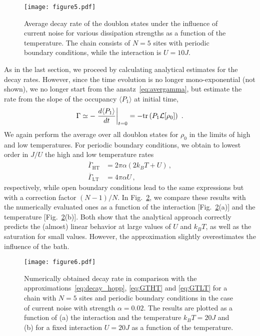 \documentclass[twocolumn,prb,showpacs]{revtex4-1}
\DeclarePairedDelimiter\mean{\langle}{\rangle}
\newcommand*{\diff}{d}
\newcommand*{\tr}[1]{\mathrm{tr}\left(#1\right)}
\begin{document}
\begin{figure}
    \centering\texttt{[image: figure5.pdf]}
    \caption{Average decay rate of the doublon states under the influence
    of current noise for various dissipation strengths as a function of
    the temperature.  The chain consists of $N=5$ sites with periodic boundary
    conditions, while the interaction is $U=10J$.}
    \label{fig:numerics_hopp}
\end{figure}

As in the last section, we proceed by calculating analytical estimates for
the decay rates.  However, since the time evolution is no longer
mono-exponential (not shown), we no longer start from the
ansatz~\eqref{eq:avergamma}, but estimate the rate from the slope of the
occupancy $\langle P_1\rangle$ at initial time,
\begin{equation}
    \Gamma \simeq - \left. \frac{\diff \mean{P_1}}{\diff t} \right|_{t=0} =
        - \tr{P_1\mathcal{L}[\rho_0]} \ .
    \label{eq:decay_hopp}
\end{equation}
We again perform the average over all doublon states for $\rho_0$
in the limits of high and low temperatures.  For periodic boundary
conditions, we obtain to lowest order in $J/U$ the high and low temperature
rates 
\begin{align}
    \overline{\Gamma}_\mathrm{HT} & = 2\pi\alpha \left(2k_B T+U \right) \,,
    \label{eq:GTHT}  \\
    \overline{\Gamma}_\text{LT} & = 4\pi\alpha U \,,
    \label{eq:GTLT}
\end{align}
respectively,
while open boundary conditions lead to the same expressions but with a
correction factor $(N-1)/N$.
In Fig.~\ref{fig:analyricsHopp}, we compare these results with the
numerically evaluated ones as a function of the interaction
[Fig.~\ref{fig:analyricsHopp}(a)] and
the temperature [Fig.~\ref{fig:analyricsHopp}(b)].  Both show that the
analytical approach correctly predicts the (almost) linear behavior at
large values of $U$ and $k_BT$, as well as the saturation for small values.
However, the approximation slightly overestimates the influence of the
bath.

\begin{figure}
    \centering\texttt{[image: figure6.pdf]}
    \caption{Numerically obtained decay rate in comparison with the
        approximations~\eqref{eq:decay_hopp}, \eqref{eq:GTHT} and 
        \eqref{eq:GTLT} for a chain with $N=5$ sites and periodic boundary 
        conditions in the case of current noise with strength $\alpha=0.02$.  
        The results are plotted as a function of (a) the interaction and the 
        temperature $k_B T=20J$ and (b) for a fixed interaction $U=20J$ as a 
        function of the temperature.}
    \label{fig:analyricsHopp}
\end{figure}
\end{document}
